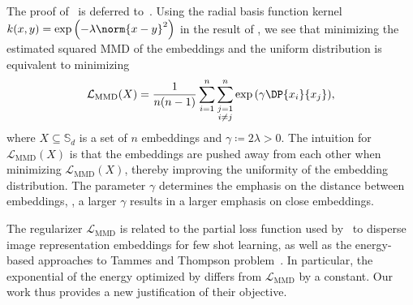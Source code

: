 \documentclass[10pt]{article} %
\begin{document}
The proof of~
is deferred to~.
Using the radial basis function kernel \(k(x,y) = \exp{\left( -\lambda \norm{x - y}^2 \right)}\) in the result of , we see that minimizing the estimated squared MMD of the embeddings and the uniform distribution is equivalent to minimizing
\begin{equation}
    \mathcal{L}_{\text{MMD}}(X) = \frac{1}{n(n-1)} \sum\limits^n_{i=1}\sum\limits^n_{\substack{j=1 \\ i \neq j}} \exp{\left( \gamma \DP{x_i}{x_j} \right)},
\end{equation}
where \(X \subseteq \mathbb S_d\) is a set of \(n\) embeddings and \(\gamma \coloneqq 2 \lambda > 0\). 
The intuition for \(\mathcal{L}_{\text{MMD}}(X)\) is that the embeddings are pushed away from each other when minimizing \(\mathcal{L}_{\text{MMD}}(X)\), thereby improving the uniformity of the embedding distribution.
The parameter \(\gamma\) determines the emphasis on the distance between embeddings, \ie, a larger $\gamma$ results in a larger emphasis on close embeddings. 

The regularizer \(\mathcal L_{\text{MMD}}\) is related to the partial loss function used by~\citet{Trosten-noHub-2023} to disperse image representation embeddings for few shot learning, as well as the energy-based approaches to Tammes and Thompson problem~\citep{Gautam2013ANA,liu2018learning,pmlr-v130-liu21d}.
In particular, the exponential of the energy optimized by \citet{Trosten-noHub-2023,pmlr-v119-wang20k} differs from \(\mathcal{L}_{\text{MMD}}\) by a constant. Our work thus provides a new justification of their objective.
\end{document}
